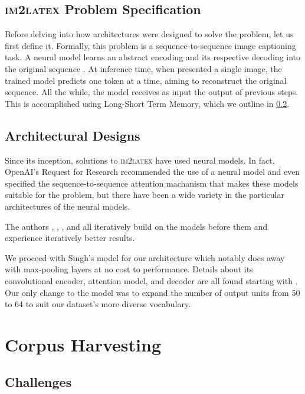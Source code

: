 \documentclass[12pt]{article}
\begin{document}
\cprotect
\subsection{\textsc{im2latex} Problem Specification}

Before delving into how architectures were designed to solve the problem, let us
first define it. Formally, this problem is a sequence-to-sequence image
captioning task. A neural model learns an abstract encoding and its respective
decoding into the original sequence \parencite[1]{deng2016you}. At inference
time, when presented a single image, the trained model predicts one token at a
time, aiming to reconstruct the original sequence. All the while, the model
receives as input the output of previous steps. This is accomplished using
Long-Short Term Memory, which we outline in \ref{netarch}.

\subsection{Architectural Designs}
\label{netarch}

Since its inception, solutions to \textsc{im2latex} have used neural models. In
fact, OpenAI's Request for Research recommended the use of a neural model and
even specified the sequence-to-sequence attention machanism that makes these
models suitable for the problem, but there have been a wide variety in the
particular architectures of the neural models.

The authors \citeauthor{deng2016you}, \citeauthor{genthial2016image},
\citeauthor{wang2019translating}, and \citeauthor{bender2019learning} all
iteratively build on the models before them and experience iteratively better
results.

We proceed with Singh's model for our architecture which notably does away with
max-pooling layers at no cost to performance. Details about its convolutional
encoder, attention model, and decoder are all found starting with
\cite[3]{singh2018teaching}. Our only change to the model was to expand the
number of output units from 50 to 64 to suit our dataset's more diverse
vocabulary.

\section{Corpus Harvesting}


\subsection{Challenges}
\end{document}
